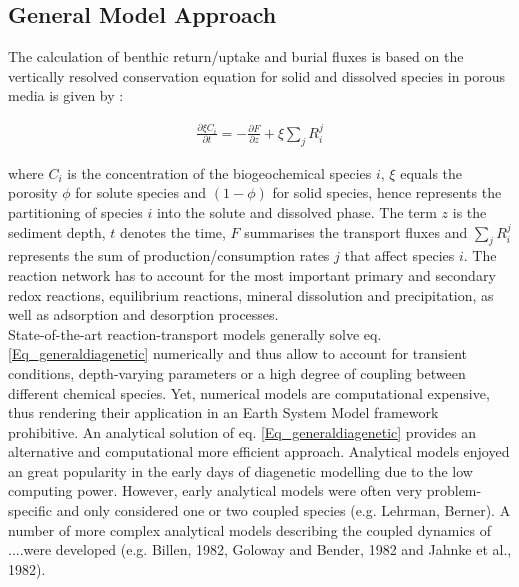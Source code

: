 \documentclass[gmd, manuscript]{copernicus}
\begin{document}
\subsection {General Model Approach}
The calculation of benthic return/uptake and burial fluxes is based on the vertically resolved conservation equation for solid and dissolved species in porous media is given by  \citep[e.g.][]{Boudreau:1997}:

\begin{eqnarray}
\frac{\partial \xi C_i}{\partial t}=-\frac{\partial F}{\partial z}+\xi \sum_j R_i^j \label{Eq_generaldiagenetic}
\end{eqnarray}

where $C_i$ is the concentration of the biogeochemical species $i$, $\xi$ equals the porosity $\phi$ for solute species and $(1-\phi)$ for solid species, hence represents the partitioning of species $i$ into the solute and dissolved phase. The term $z$ is the sediment depth, $t$ denotes the time, $F$ summarises the transport fluxes and $\sum_j R_i^j$ represents the sum of production/consumption rates $j$ that affect species $i$. The reaction network has to account for the most important primary and secondary redox reactions, equilibrium reactions, mineral dissolution and precipitation, as well as adsorption and desorption processes.\\
State-of-the-art reaction-transport models generally solve eq. \ref{Eq_generaldiagenetic} numerically and thus allow to account for transient conditions, depth-varying parameters or a high degree of coupling between different chemical species. Yet, numerical models are computational expensive, thus rendering their application in an Earth System Model framework prohibitive. An analytical solution of eq. \ref{Eq_generaldiagenetic} provides an alternative and computational more efficient approach. Analytical models enjoyed an great popularity in the early days of diagenetic modelling due to the low computing power. However, early analytical models were often very problem-specific and only considered one or two coupled species  (e.g. Lehrman, Berner). A number of more complex analytical models describing the coupled dynamics of ....were developed (e.g. Billen, 1982, Goloway and Bender, 1982 and Jahnke et al., 1982). 
\end{document}
